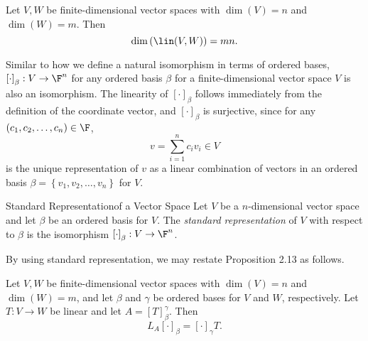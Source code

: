 \documentclass[linearalgebraI]{subfiles}
\begin{document}
    \begin{cor}{}
        Let $V, W$ be finite-dimensional vector spaces with $\dim(V)=n$ and $\dim(W)=m$. Then
        \begin{equation*}
            \dim\left( \lin(V,W) \right) = mn.
        \end{equation*}
    \end{cor}	

    \begin{remark}
        Similar to how we define a natural isomorphism in terms of ordered bases, $\left[ \cdot \right] _\beta:V\to\F^n$ for any ordered basis $\beta$ for a finite-dimensional vector space $V$ is also an isomorphism. The linearity of $\left[ \cdot \right] _\beta$ follows immediately from the definition of the coordinate vector, and $\left[ \cdot \right] _\beta$ is surjective, since for any $\left( c_1,c_2,\ldots,c_n \right) \in\F$,
        \begin{equation*}
            v = \sum^{n}_{i=1} c_iv_i\in V
        \end{equation*}
        is the unique representation of $v$ as a linear combination of vectors in an ordered basis $\beta=\left\lbrace v_1,v_2,\ldots,v_n \right\rbrace$ for $V$.
    \end{remark}

    \begin{definition}{Standard Representation}{of a Vector Space}
        Let $V$ be a $n$-dimensional vector space and let $\beta$ be an ordered basis for $V$. The \emph{standard representation} of $V$ with respect to $\beta$ is the isomorphism $\left[ \cdot \right] _\beta:V\to\F^n$.
    \end{definition}

    \begin{remark}
        By using standard representation, we may restate Proposition 2.13 as follows.
    \end{remark}

    \begin{prop}{}
        Let $V, W$ be finite-dimensional vector spaces with $\dim(V)=n$ and $\dim(W)=m$, and let $\beta$ and $\gamma$ be ordered bases for $V$ and $W$, respectively. Let $T:V\to W$ be linear and let $A=\left[ T \right] ^\gamma_\beta$. Then
        \begin{equation*}
            L_A\left[ \cdot \right] _\beta = \left[ \cdot \right] _\gamma T.
        \end{equation*}
    \end{prop}
\end{document}
